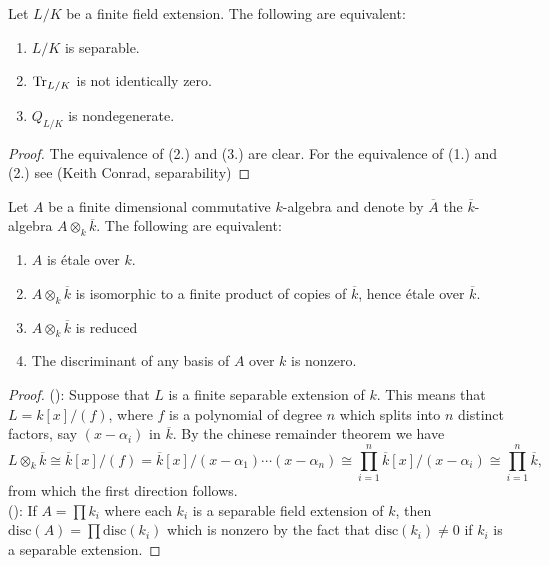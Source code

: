 \begin{lemma}
	Let $L/K$ be a finite field extension. The following are equivalent:
	\begin{enumerate}
		\item $L/K$ is separable.
		\item $\operatorname{Tr}_{L/K}$ is not identically zero.
		\item $Q_{L/K}$ is nondegenerate.
	\end{enumerate}
\end{lemma}

\begin{proof}
	The equivalence of (2.) and (3.) are clear.
	For the equivalence of (1.) and (2.) see (Keith Conrad, separability)
\end{proof}

\begin{theorem}
	Let $A$ be a finite dimensional commutative $k$-algebra and denote by $\overline{A}$ the $\overline{k}$-algebra $A \otimes_k \overline{k}$. The following are equivalent:
	\begin{enumerate}
		\item $A$ is \'etale over $k$.\label{etale}
		\item $A \otimes_k \overline{k}$ is isomorphic to a finite product of copies of $\overline{k}$, hence \'etale over $\overline{k}$.\label{product}
		\item $A \otimes_k \overline{k}$ is reduced
		\item The discriminant of any basis of $A$ over $k$ is nonzero.\label{trace}
	\end{enumerate}
\end{theorem}

\begin{proof}
	():
	Suppose that $L$ is a finite separable extension of $k$. This means that $L = k[x]/(f)$, where $f$ is a polynomial of degree $n$ which splits into $n$ distinct factors, say $(x-\alpha_i)$ in $\overline{k}$. By the chinese remainder theorem we have
	\[L \otimes_k \overline{k} \cong \overline{k}[x]/(f) = \overline{k}[x]/(x-\alpha_1)\cdots(x-\alpha_n) \cong \prod_{i=1}^n \overline{k}[x] / (x-\alpha_i) \cong \prod_{i=1}^n \overline{k},\] from which the first direction follows.\\
	():
	If $A = \prod k_i$  where each $k_i$ is a separable field extension of $k$, then $\text{disc}(A) = \prod \text{disc}(k_i)$ which is nonzero by the fact that $\text{disc}(k_i) \neq 0$ if $k_i$ is a separable extension.
\end{proof}

